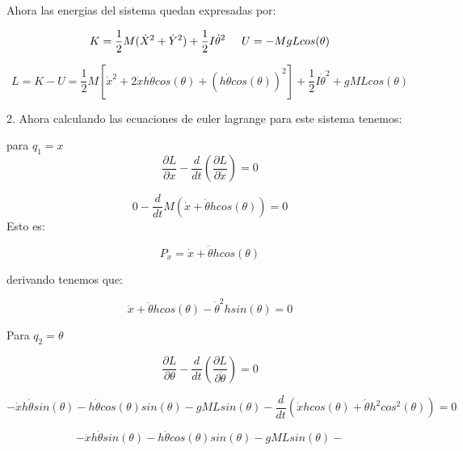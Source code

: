 \documentclass[12 pt]{article}
\begin{document}
Ahora las energias del sistema quedan expresadas por:

\begin{equation*}
K = \frac{1}{2} M (\dot{X}^{2} + \dot{Y}^{2}) + \frac{1}{2}I \dot{\theta}^{2} \hspace{0.5cm} U= -MgLcos(\theta)
\end{equation*}


\begin{equation*}
L = K- U = \frac{1}{2} M \left[\dot{x}^{2}+ 2\dot{x}h\dot{\theta}cos(\theta)+(h\dot{\theta}cos(\theta))^{2}\right] + \frac{1}{2} I \dot{\theta}^{2} + gML cos(\theta)
\end{equation*}


2. Ahora calculando las ecuaciones de euler lagrange para este sistema tenemos:


para $q_{1} = x$
\begin{equation*}
\frac{\partial L }{\partial x} - \frac{d}{dt} \left( \frac{\partial L}{\partial \dot{x}}\right)= 0
\end{equation*}

\begin{equation*}
 0 - \frac{d}{dt}M \left( \dot{x} + \dot{\theta}h cos(\theta)\right) = 0 
\end{equation*}
 Esto es: 
 
 
 \begin{equation*}
 P_{x} = \dot{x} + \dot{\theta}h cos(\theta)
 \end{equation*}
 
 derivando tenemos que:
 
 \begin{equation*}
  \ddot{x} + \ddot{\theta}h cos(\theta) - \dot{\theta}^{2} hsin(\theta)=0
 \end{equation*}


Para $q_{2}= \theta$

\begin{equation*}
\frac{\partial L }{\partial \theta} - \frac{d}{dt} \left( \frac{\partial L}{\partial \dot{\theta}}\right)= 0
\end{equation*}

\begin{equation*}
-\dot{x}h\dot{\theta}sin(\theta) - h\dot{\theta}cos(\theta)sin(\theta)- gMLsin(\theta)-\frac{d}{dt} \left( \dot{x}hcos(\theta)+\dot{\theta} h^{2} cos^{2}(\theta)\right) = 0 
\end{equation*}



\begin{equation*}
-\dot{x}h\dot{\theta}sin(\theta) - h\dot{\theta}cos(\theta)sin(\theta)- gMLsin(\theta)-
\end{equation*}
\end{document}
